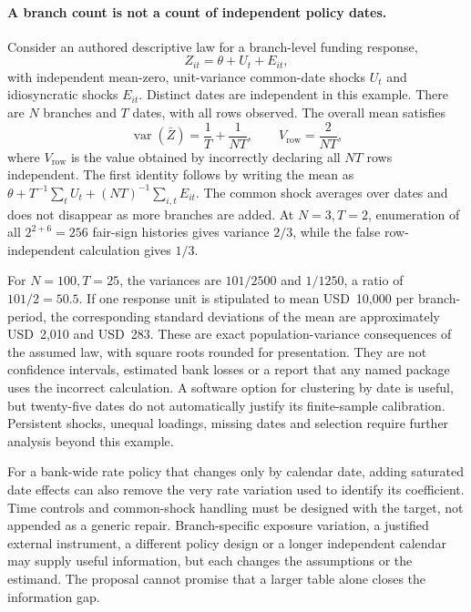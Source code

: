 \paragraph{A branch count is not a count of independent policy dates.}
Consider an authored descriptive law for a branch-level funding response,
\begin{equation}
 Z_{it}=\theta+U_t+E_{it},
 \label{exec19:dynamic-calendar}
\end{equation}
with independent mean-zero, unit-variance common-date shocks $U_t$ and
idiosyncratic shocks $E_{it}$. Distinct dates are independent in this example.
There are $N$ branches and $T$ dates, with all rows observed. The overall mean
satisfies
\begin{equation}
 \operatorname{var}(\bar Z)=\frac1T+\frac1{NT},
 \qquad
 V_{\mathrm{row}}=\frac2{NT},
 \label{exec19:dynamic-variance}
\end{equation}
where $V_{\mathrm{row}}$ is the value obtained by incorrectly declaring
all $NT$ rows independent. The first identity follows by writing the mean as
$\theta+T^{-1}\sum_t U_t+(NT)^{-1}\sum_{i,t}E_{it}$. The common
shock averages over dates and does not disappear as more branches are added.
At $N=3,T=2$, enumeration of all $2^{2+6}=256$ fair-sign histories gives
variance $2/3$, while the false row-independent calculation gives $1/3$.
\citep{exec19_dynamic_reference}

For $N=100,T=25$, the variances are $101/2500$ and $1/1250$, a ratio of
$101/2=50.5$. If one response unit is stipulated to mean USD~10,000 per
branch-period, the corresponding standard deviations of the mean are
approximately USD~2,010 and USD~283. These are exact population-variance
consequences of the assumed law, with square roots rounded for presentation.
They are not confidence intervals, estimated bank losses or a report that
any named package uses the incorrect calculation. A software option for
clustering by date is useful, but twenty-five dates do not automatically
justify its finite-sample calibration. Persistent shocks, unequal loadings,
missing dates and selection require further analysis beyond this example.
\citep{exec19_dynamic_reference}

For a bank-wide rate policy that changes only by calendar date, adding
saturated date effects can also remove the very rate variation used to
identify its coefficient. Time controls and common-shock handling must be
designed with the target, not appended as a generic repair. Branch-specific
exposure variation, a justified external instrument, a different policy
design or a longer independent calendar may supply useful information, but
each changes the assumptions or the estimand. The proposal cannot promise
that a larger table alone closes the information gap.

